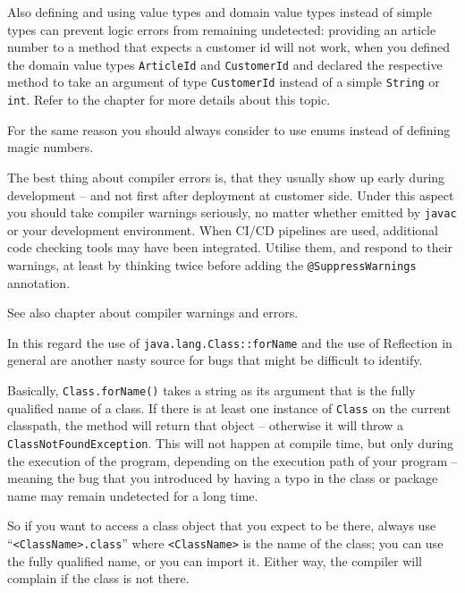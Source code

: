 Also defining and using value types and domain value types instead of simple types can prevent logic errors from remaining undetected: providing an article number to a method that expects a customer id will not work, when you defined the domain value types \lstinline|ArticleId| and \lstinline|CustomerId| and declared the respective method to take an argument of type \lstinline|CustomerId| instead of a simple \lstinline|String| or \lstinline|int|. Refer to the chapter  for more details about this topic.

For the same reason you should always consider to use enums instead of defining magic numbers.

The best thing about compiler errors is, that they usually show up early during development – and not first after deployment at customer side. Under this aspect you should take compiler warnings seriously, no matter whether emitted by \verb#javac# or your development environment. When CI/CD pipelines are used, additional code checking tools may have been integrated. Utilise them, and respond to their warnings, at least by thinking twice before adding the \lstinline|@SuppressWarnings|\autocite{ORACLE_DOC_SUPPRESSWARNINGS_ANNOTATION} annotation.

See also chapter  about compiler warnings and errors.

In this regard the use of \lstinline|java.lang.Class::forName|\autocite{ORACLE_DOC_CLASS:forName} and the use of Reflection in general are another nasty source for bugs that might be difficult to identify.

Basically, \lstinline|Class.forName()| takes a string as its argument that is the fully qualified name of a class. If there is at least one instance of \lstinline|Class| on the current classpath, the method will return that object – otherwise it will throw a \lstinline|ClassNotFoundException|\autocite{ORACLE_DOC_CLASSNOTFOUNDEXCEPTION_CLASS}. This will not happen at compile time, but only during the execution of the program, depending on the execution path of your program – meaning the bug that you introduced by having a typo in the class or package name may remain undetected for a long time.

So if you want to access a class object that you expect to be there, always use “\lstinline|<ClassName>.class|” where \verb#<ClassName># is the name of the class; you can use the fully qualified name, or you can import it. Either way, the compiler will complain if the class is not there.


